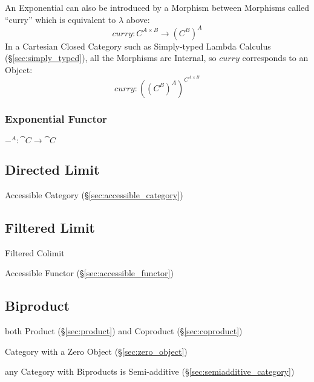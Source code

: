 An Exponential can also be introduced by a Morphism between Morphisms
called ``curry'' which is equivalent to $\lambda$ above:
\[
  curry : C^{A \times B} \rightarrow (C^B)^A
\]
In a Cartesian Closed Category such as Simply-typed Lambda Calculus
(\S\ref{sec:simply_typed}), all the Morphisms are Internal, so $curry$
corresponds to an Object:
\[
  curry : ((C^B)^A)^{C^{A \times B}}
\]



\subsubsection{Exponential Functor}\label{sec:exponential_functor}

$-^A : \cat{C} \rightarrow \cat{C}$



\subsection{Directed Limit}\label{sec:directed_limit}

Accessible Category (\S\ref{sec:accessible_category})



\subsection{Filtered Limit}\label{sec:filtered_limit}

Filtered Colimit

Accessible Functor (\S\ref{sec:accessible_functor})



\subsection{Biproduct}\label{sec:biproduct}

both Product (\S\ref{sec:product}) and Coproduct
(\S\ref{sec:coproduct})

Category with a Zero Object (\S\ref{sec:zero_object})

any Category with Biproducts is Semi-additive
(\S\ref{sec:semiadditive_category})



